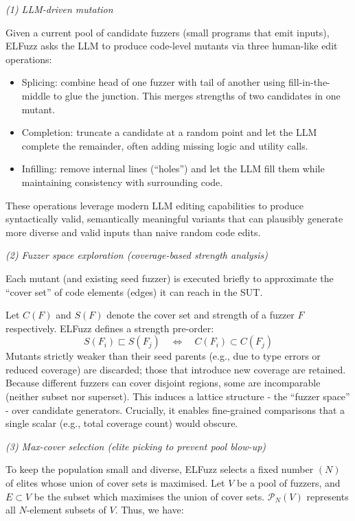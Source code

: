 \lilspace
\textit{(1) LLM-driven mutation}

Given a current pool of candidate fuzzers (small programs that emit inputs), ELFuzz asks the LLM to produce code-level mutants via three human-like edit operations:

\begin{itemize}
    \item Splicing: combine head of one fuzzer with tail of another using fill-in-the-middle to glue the junction. This merges strengths of two candidates in one mutant.
    \item Completion: truncate a candidate at a random point and let the LLM complete the remainder, often adding missing logic and utility calls.
    \item Infilling: remove internal lines (``holes'') and let the LLM fill them while maintaining consistency with surrounding code.
\end{itemize}

These operations leverage modern LLM editing capabilities to produce syntactically valid, semantically meaningful variants that can plausibly generate more diverse and valid inputs than naive random code edits.

\lilspace
\textit{(2) Fuzzer space exploration (coverage-based strength analysis)}

Each mutant (and existing seed fuzzer) is executed briefly to approximate the ``cover set'' of code elements (edges) it can reach in the SUT.

Let $C(F)$ and $S(F)$ denote the cover set and strength of a fuzzer $F$ respectively. ELFuzz defines a strength pre-order:
\[
    S(F_i) \sqsubset S(F_j)\quad \iff \quad C(F_i) \subset C(F_j)
\]
Mutants strictly weaker than their seed parents (e.g., due to type errors or reduced coverage) are discarded; those that introduce new coverage are retained. Because different fuzzers can cover disjoint regions, some are incomparable (neither subset nor superset). This induces a lattice structure - the ``fuzzer space'' - over candidate generators. Crucially, it enables fine-grained comparisons that a single scalar (e.g., total coverage count) would obscure.

\lilspace
\textit{(3) Max-cover selection (elite picking to prevent pool blow-up)}

To keep the population small and diverse, ELFuzz selects a fixed number $(N)$ of elites whose union of cover sets is maximised. Let $V$ be a pool of fuzzers, and $E \subset V$ be the subset which maximises the union of cover sets. $\mathcal{P}_{N}(V)$ represents all $N$-element subsets of $V$. Thus, we have:


